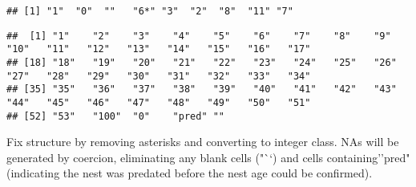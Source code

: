 \documentclass[
]{article}
\newenvironment{Shaded}{\begin{snugshade}}{\end{snugshade}}
\newcommand{\AttributeTok}[1]{\textcolor[rgb]{0.77,0.63,0.00}{#1}}
\newcommand{\CommentTok}[1]{\textcolor[rgb]{0.56,0.35,0.01}{\textit{#1}}}
\newcommand{\FunctionTok}[1]{\textcolor[rgb]{0.00,0.00,0.00}{#1}}
\newcommand{\NormalTok}[1]{#1}
\newcommand{\OtherTok}[1]{\textcolor[rgb]{0.56,0.35,0.01}{#1}}
\newcommand{\SpecialCharTok}[1]{\textcolor[rgb]{0.00,0.00,0.00}{#1}}
\newcommand{\StringTok}[1]{\textcolor[rgb]{0.31,0.60,0.02}{#1}}
\begin{document}
\begin{verbatim}
## [1] "1"  "0"  ""   "6*" "3"  "2"  "8"  "11" "7"
\end{verbatim}

\begin{Shaded}
\end{Shaded}

\begin{verbatim}
##  [1] "1"    "2"    "3"    "4"    "5"    "6"    "7"    "8"    "9"    "10"   "11"   "12"   "13"   "14"   "15"   "16"   "17"  
## [18] "18"   "19"   "20"   "21"   "22"   "23"   "24"   "25"   "26"   "27"   "28"   "29"   "30"   "31"   "32"   "33"   "34"  
## [35] "35"   "36"   "37"   "38"   "39"   "40"   "41"   "42"   "43"   "44"   "45"   "46"   "47"   "48"   "49"   "50"   "51"  
## [52] "53"   "100"  "0"    "pred" ""
\end{verbatim}

Fix structure by removing asterisks and converting to integer class. NAs
will be generated by coercion, eliminating any blank cells ("``) and
cells containing''pred" (indicating the nest was predated before the
nest age could be confirmed).

\begin{Shaded}
\end{Shaded}
\end{document}
